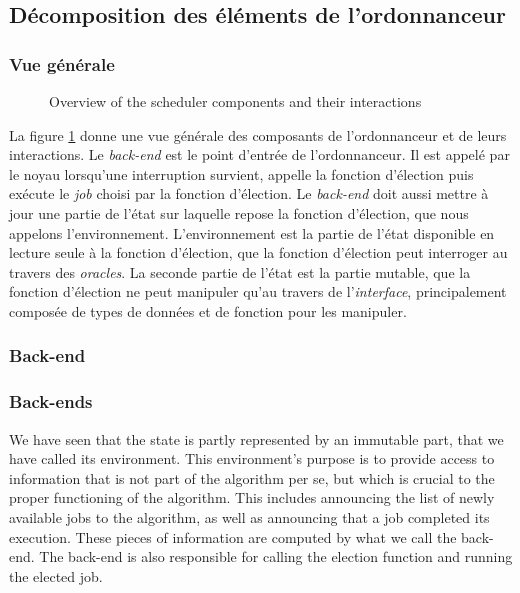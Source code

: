 		\subsection{Décomposition des éléments de l'ordonnanceur}
			\subsubsection{Vue générale}
			\begin{figure}[!ht]
			    \centering
			    
			    \caption{Overview of the scheduler components and their interactions}
			    \label{fig:project_overview}
			\end{figure}


			La figure \ref{fig:project_overview} donne une vue générale des composants de l'ordonnanceur et de leurs interactions. Le \emph{back-end} est le point d'entrée de l'ordonnanceur. Il est appelé par le noyau lorsqu'une interruption survient, appelle la fonction d'élection puis exécute le \emph{job} choisi par la fonction d'élection. Le \emph{back-end} doit aussi mettre à jour une partie de l'état sur laquelle repose la fonction d'élection, que nous appelons l'environnement. L'environnement est la partie de l'état disponible en lecture seule à la fonction d'élection, que la fonction d'élection peut interroger au travers des \emph{oracles}. La seconde partie de l'état est la partie mutable, que la fonction d'élection ne peut manipuler qu'au travers de l'\emph{interface}, principalement composée de types de données et de fonction pour les manipuler.

			\subsubsection{Back-end}
		\subsubsection{Back-ends}
		\label{sec:back-ends}

		

		We have seen that the state is partly represented by an immutable part, that we have called its environment. This environment's purpose is to provide access to information that is not part of the algorithm per se, but which is crucial to the proper functioning of the algorithm. This includes announcing the list of newly available jobs to the algorithm, as well as announcing that a job completed its execution. These pieces of information are computed by what we call the back-end. The back-end is also responsible for calling the election function and running the elected job.

